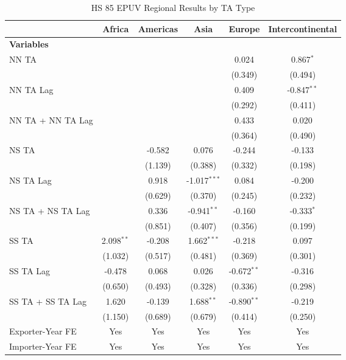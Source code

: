 \begin{table}[htbp]
    \centering
    \caption{HS 85 EPUV Regional Results by TA Type}
    \label{tab:85_pta_types}
    \begin{adjustbox}{max width=\textwidth}
    \begin{tabular}{lccccc}
    \hline
     & \multicolumn{1}{c}{Africa} & \multicolumn{1}{c}{Americas} & \multicolumn{1}{c}{Asia} & \multicolumn{1}{c}{Europe} & \multicolumn{1}{c}{Intercontinental} \\
    \hline
    \textbf{Variables} &  &  &  &  &  \\
    \hline
    NN TA &  &  &  & 0.024 & 0.867$^{\ast}$ \\
     &  &  &  & (0.349) & (0.494) \\
    NN TA Lag &  &  &  & 0.409 & -0.847$^{\ast\ast}$ \\
     &  &  &  & (0.292) & (0.411) \\
    NN TA + NN TA Lag &  &  &  & 0.433 & 0.020 \\
     &  &  &  & (0.364) & (0.490) \\
    \hline
    NS TA &  & -0.582 & 0.076 & -0.244 & -0.133 \\
     &  & (1.139) & (0.388) & (0.332) & (0.198) \\
    NS TA Lag &  & 0.918 & -1.017$^{\ast\ast\ast}$ & 0.084 & -0.200 \\
     &  & (0.629) & (0.370) & (0.245) & (0.232) \\
    NS TA + NS TA Lag &  & 0.336 & -0.941$^{\ast\ast}$ & -0.160 & -0.333$^{\ast}$ \\
     &  & (0.851) & (0.407) & (0.356) & (0.199) \\
    \hline
    SS TA & 2.098$^{\ast\ast}$ & -0.208 & 1.662$^{\ast\ast\ast}$ & -0.218 & 0.097 \\
     & (1.032) & (0.517) & (0.481) & (0.369) & (0.301) \\
    SS TA Lag & -0.478 & 0.068 & 0.026 & -0.672$^{\ast\ast}$ & -0.316 \\
     & (0.650) & (0.493) & (0.328) & (0.336) & (0.298) \\
    SS TA + SS TA Lag & 1.620 & -0.139 & 1.688$^{\ast\ast}$ & -0.890$^{\ast\ast}$ & -0.219 \\
     & (1.150) & (0.689) & (0.679) & (0.414) & (0.250) \\
    \hline
    Exporter-Year FE & Yes & Yes & Yes & Yes & Yes \\
    Importer-Year FE & Yes & Yes & Yes & Yes & Yes \\

\end{tabular}
\end{adjustbox}
\end{table}

